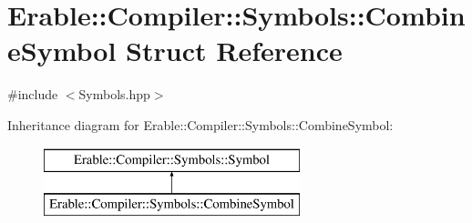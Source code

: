 \hypertarget{struct_erable_1_1_compiler_1_1_symbols_1_1_combine_symbol}{}\section{Erable\+::Compiler\+::Symbols\+::Combine\+Symbol Struct Reference}
\label{struct_erable_1_1_compiler_1_1_symbols_1_1_combine_symbol}


{\ttfamily \#include $<$Symbols.\+hpp$>$}

Inheritance diagram for Erable\+::Compiler\+::Symbols\+::Combine\+Symbol\+:\begin{figure}[H]
\begin{center}
\leavevmode
\includegraphics[height=2.000000cm]{struct_erable_1_1_compiler_1_1_symbols_1_1_combine_symbol}
\end{center}
\end{figure}
